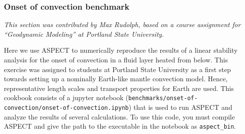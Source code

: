 \documentclass{article}
\newcommand{\aspect}{\textsc{ASPECT}}
\begin{document}
\subsubsection{Onset of convection benchmark}
\label{sec:benchmark-onset-of-convection}
\textit{This section was contributed by Max Rudolph, based on a course assignment for ``Geodynamic Modeling'' at Portland State University.}

Here we use \aspect{} to numerically reproduce the results of a linear stability analysis for the onset of convection in a fluid layer heated from below. This exercise was assigned to students at Portland State University as a first step towards setting up a nominally Earth-like mantle convection model. Hence, representative length scales and transport properties for Earth are used. This cookbook consists of a jupyter notebook (\texttt{benchmarks/onset-of-convection/onset-of-convection.ipynb}) that is used to run \aspect{} and analyze the results of several calculations. To use this code, you must compile \aspect{} and give the path to the executable in the notebook as \texttt{aspect\_bin}. 
\end{document}
